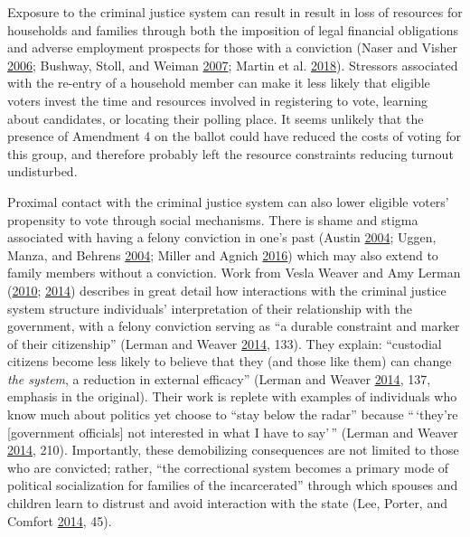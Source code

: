 \documentclass[
  12pt,
]{article}
\begin{document}
Exposure to the criminal justice system can result in result in loss of resources for households and families through both the imposition of legal financial obligations and adverse employment prospects for those with a conviction (Naser and Visher \protect\hyperlink{ref-Naser2006}{2006}; Bushway, Stoll, and Weiman \protect\hyperlink{ref-Bushway2007}{2007}; Martin et al. \protect\hyperlink{ref-Martin2018}{2018}). Stressors associated with the re-entry of a household member can make it less likely that eligible voters invest the time and resources involved in registering to vote, learning about candidates, or locating their polling place. It seems unlikely that the presence of Amendment 4 on the ballot could have reduced the costs of voting for this group, and therefore probably left the resource constraints reducing turnout undisturbed.

Proximal contact with the criminal justice system can also lower eligible voters' propensity to vote through social mechanisms. There is shame and stigma associated with having a felony conviction in one's past (Austin \protect\hyperlink{ref-Austin2004}{2004}; Uggen, Manza, and Behrens \protect\hyperlink{ref-Uggen2004a}{2004}; Miller and Agnich \protect\hyperlink{ref-Miller2016}{2016}) which may also extend to family members without a conviction. Work from Vesla Weaver and Amy Lerman (\protect\hyperlink{ref-Weaver2010}{2010}; \protect\hyperlink{ref-Lerman2014}{2014}) describes in great detail how interactions with the criminal justice system structure individuals' interpretation of their relationship with the government, with a felony conviction serving as ``a durable constraint and marker of their citizenship'' (Lerman and Weaver \protect\hyperlink{ref-Lerman2014}{2014}, 133). They explain: ``custodial citizens become less likely to believe that they (and those like them) can change \emph{the system}, a reduction in external efficacy'' (Lerman and Weaver \protect\hyperlink{ref-Lerman2014}{2014}, 137, emphasis in the original). Their work is replete with examples of individuals who know much about politics yet choose to ``stay below the radar'' because ``\,`they're {[}government officials{]} not interested in what I have to say'\,'' (Lerman and Weaver \protect\hyperlink{ref-Lerman2014}{2014}, 210). Importantly, these demobilizing consequences are not limited to those who are convicted; rather, ``the correctional system becomes a primary mode of political socialization for
families of the incarcerated'' through which spouses and children learn to distrust and avoid interaction with the state (Lee, Porter, and Comfort \protect\hyperlink{ref-Lee2014}{2014}, 45).
\end{document}
